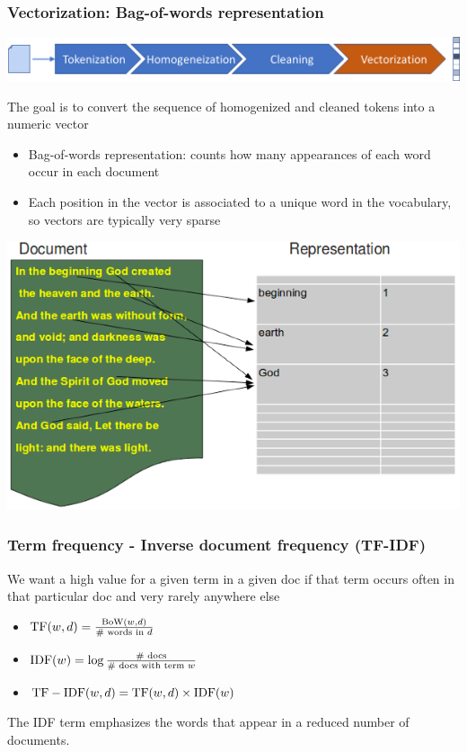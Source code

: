 \documentclass{beamer}
\begin{document}
\begin{frame}

    \frametitle{Vectorization: Bag-of-words representation}

    \centerline{\includegraphics[width=\textwidth]{./figs/NLPTM_vectorization.png}}

    The goal is to convert the sequence of homogenized and cleaned tokens into a numeric vector
    \begin{itemize}
    	\item Bag-of-words representation: counts how many appearances of each word occur in each document
    	\item Each position in the vector is associated to a unique word in the vocabulary, so vectors are typically very sparse
    \end{itemize}
    
    \vspace{.2cm}
    \centerline{\includegraphics[width=.5\textwidth]{./figs/NLPTM_BoW.png}}
    			    
\end{frame}


\begin{frame}

    \frametitle{Term frequency - Inverse document frequency (TF-IDF)}

    We want a high value for a given term in a given doc if that term occurs often in that particular doc and very rarely anywhere else

	\begin{itemize}
	
	\item ${\rm TF}(w,d) = \frac{{\rm BoW}(w,d)}{\# {\text{ words in } d}}$
	\item ${\rm IDF}(w) = \log \frac{\# {\text{ docs}}}{\# {\text{ docs with term } w}}$
	\item ${\rm TF-IDF}(w,d) = {\rm TF}(w,d) \times {\rm IDF}(w)$
		
	\end{itemize}
	
	The IDF term emphasizes the words that appear in a reduced number of documents.
    			    
\end{frame}
\end{document}
